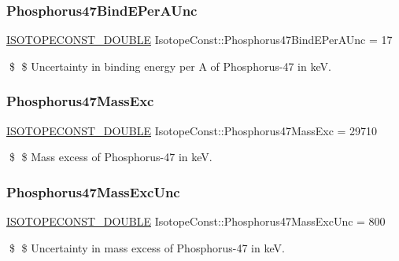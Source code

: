 \subsubsection{\texorpdfstring{Phosphorus47\+Bind\+E\+Per\+A\+Unc}{Phosphorus47BindEPerAUnc}}
{\footnotesize\ttfamily \mbox{\hyperlink{group___isotope_const-_macros_ga8f45a7272ce02c0b4c65c44636ed719a}{I\+S\+O\+T\+O\+P\+E\+C\+O\+N\+S\+T\+\_\+\+D\+O\+U\+B\+LE}} Isotope\+Const\+::\+Phosphorus47\+Bind\+E\+Per\+A\+Unc = 17}

\$ \$ Uncertainty in binding energy per A of Phosphorus-\/47 in keV. \mbox{\label{group___isotope_const-_phosphorus-_p47_ga2cd7059198cb2e4bd7ecf69cd776bf5a}} 
\subsubsection{\texorpdfstring{Phosphorus47\+Mass\+Exc}{Phosphorus47MassExc}}
{\footnotesize\ttfamily \mbox{\hyperlink{group___isotope_const-_macros_ga8f45a7272ce02c0b4c65c44636ed719a}{I\+S\+O\+T\+O\+P\+E\+C\+O\+N\+S\+T\+\_\+\+D\+O\+U\+B\+LE}} Isotope\+Const\+::\+Phosphorus47\+Mass\+Exc = 29710}

\$ \$ Mass excess of Phosphorus-\/47 in keV. \mbox{\label{group___isotope_const-_phosphorus-_p47_ga1d7f8c64ec7e63727c404ef8b46cc027}} 
\subsubsection{\texorpdfstring{Phosphorus47\+Mass\+Exc\+Unc}{Phosphorus47MassExcUnc}}
{\footnotesize\ttfamily \mbox{\hyperlink{group___isotope_const-_macros_ga8f45a7272ce02c0b4c65c44636ed719a}{I\+S\+O\+T\+O\+P\+E\+C\+O\+N\+S\+T\+\_\+\+D\+O\+U\+B\+LE}} Isotope\+Const\+::\+Phosphorus47\+Mass\+Exc\+Unc = 800}

\$ \$ Uncertainty in mass excess of Phosphorus-\/47 in keV. \mbox{\label{group___isotope_const-_phosphorus-_p47_gac75218fd26b8bc28079687add2f5a3a1}} 
